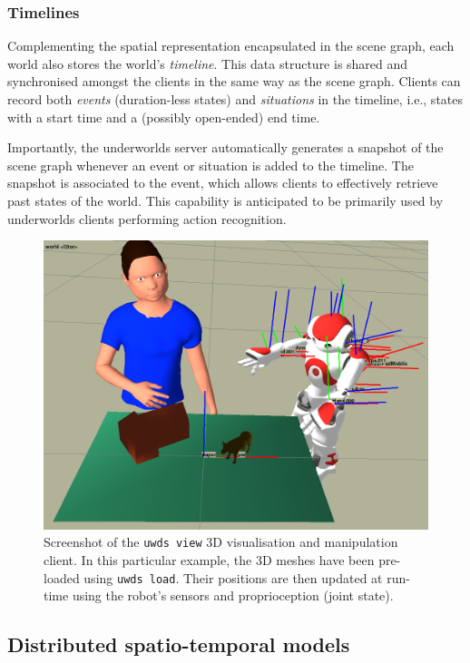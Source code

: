 \documentclass[letterpaper, 10pt, conference]{ieeeconf}
\newcommand{\ie}{i.e.,\xspace}
\newcommand{\uwds}{{\sc underworlds}\xspace}
\begin{document}
\subsubsection{Timelines}

Complementing the spatial representation encapsulated in the scene graph, each
world also stores the world's \emph{timeline}. This data structure is shared
and synchronised amongst the clients in the same way as the scene graph.
Clients can record both \emph{events} (duration-less states) and
\emph{situations} in the timeline, \ie states with a start time and a (possibly open-ended) end time.

Importantly, the \uwds server automatically generates a snapshot of
the scene graph whenever an event or situation is added to the timeline. The
snapshot is associated to the event, which allows clients to effectively retrieve past
states of the world. This capability is anticipated to be primarily used by \uwds clients
performing action recognition.

\begin{figure}
    \centering
    \includegraphics[width=\linewidth]{uwds-screenshot}
    \caption{Screenshot of the {\tt uwds view} 3D visualisation and manipulation
    client. In this particular example, the 3D meshes have been pre-loaded using
    {\tt uwds load}. Their positions are then updated at run-time using the
    robot's sensors and proprioception (joint state).}
    \label{fig|uwds-view}
\end{figure}

\subsection{Distributed spatio-temporal models}
\label{arch}
\end{document}
